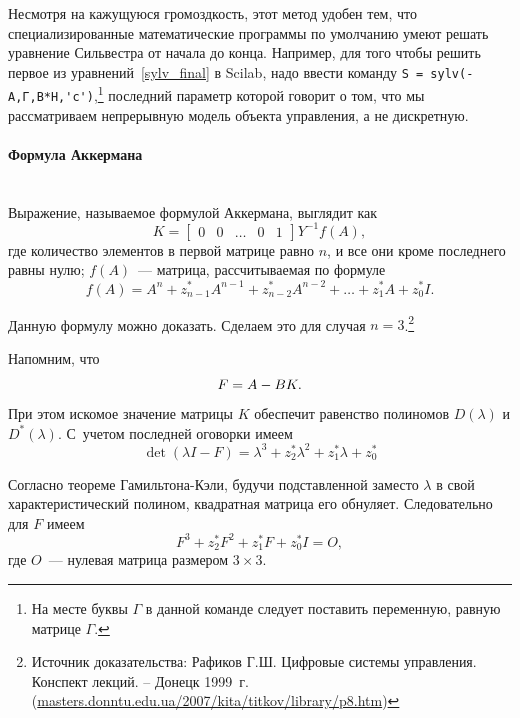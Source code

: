 \documentclass[12pt,a4paper,openany]{extarticle}
\begin{document}
Несмотря на кажущуюся громоздкость, этот метод удобен тем, что специализированные математические программы по умолчанию умеют решать уравнение Сильвестра от начала до конца.
Например, для того чтобы решить первое из уравнений~\eqref{sylv_final} в Scilab, надо ввести команду \verb|S = sylv(-A,Г,B*H,'c')|\lefteqn,\footnote{На месте буквы $\Gamma$ в данной команде следует поставить переменную, равную матрице $\varGamma$.} последний параметр которой говорит о том, что мы рассматриваем непрерывную модель объекта управления, а не дискретную.

\paragraph*{Формула Аккермана}$\phantom{-}$\\
\hspace*{\parindent}Выражение, называемое формулой Аккермана, выглядит как
\begin{equation}
	K = 
	\begin{bmatrix}
		0 & 0 & \dots & 0 & 1
	\end{bmatrix}	
	Y^{-1}f(A),
\end{equation}
где количество элементов в первой матрице равно $n$, и все они кроме последнего равны нулю; $f(A)$~--- матрица, рассчитываемая по формуле
\begin{equation}
	f(A) = A^n + z_{n-1}^*A^{n-1} + z_{n-2}^*A^{n-2} + \dots + z_1^*A + z_0^*I.
\end{equation}

Данную формулу можно доказать.
Сделаем это для случая $n=3$\lefteqn.\footnote{Источник доказательства:
Рафиков Г.Ш. Цифровые системы управления. Конспект лекций. – Донецк 1999~г. (\url{masters.donntu.edu.ua/2007/kita/titkov/library/p8.htm})}

Напомним, что
\begin{equation}\label{H=A-BK}
	F = A-BK\ldotp
\end{equation}
При этом искомое значение матрицы $K$ обеспечит равенство полиномов $D(\lambda)$ и $D^*(\lambda)$.
С~учетом последней оговорки имеем
\begin{equation}
	\det(\lambda I - F) = \lambda^3 + z^*_{2}\lambda^{2} + z^*_1\lambda + z^*_0
\end{equation}

Согласно теореме Гамильтона-Кэли, будучи подставленной заместо $\lambda$ в свой характеристический полином, квадратная матрица его обнуляет. Следовательно для $F$ имеем
\begin{equation}\label{H_in_har}
	F^3 + z^*_{2}F^{2} + z^*_1F + z^*_0I = O,
\end{equation}
где $O$~--- нулевая матрица размером $3\times3$.
\end{document}
